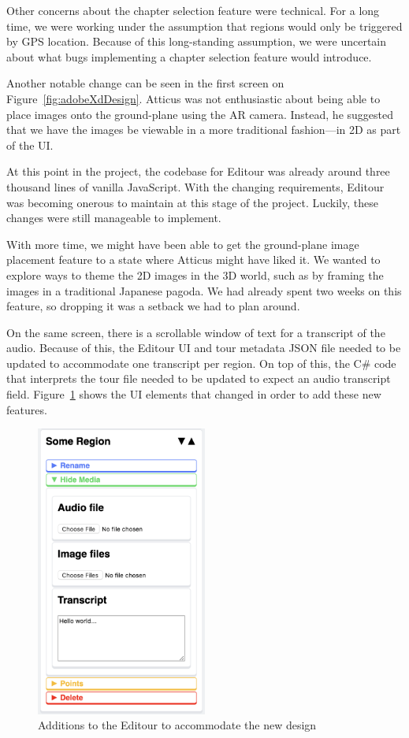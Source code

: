 \documentclass[a4paper, 10pt, american, titlepage]{article}
\begin{document}
Other concerns about the chapter selection feature were technical. For a long
time, we were working under the assumption that regions would only be triggered
by GPS location. Because of this long-standing assumption, we were uncertain
about what bugs implementing a chapter selection feature would introduce.

Another notable change can be seen in the first screen on
Figure~\ref{fig:adobeXdDesign}. Atticus was not enthusiastic about being able
to place images onto the ground-plane using the AR camera. Instead, he
suggested that we have the images be viewable in a more traditional
fashion---in 2D as part of the UI.

At this point in the project, the codebase for Editour was already around three
thousand lines of vanilla JavaScript. With the changing requirements, Editour
was becoming onerous to maintain at this stage of the project. Luckily, these
changes were still manageable to implement.

With more time, we might have been able to get the ground-plane image placement
feature to a state where Atticus might have liked it. We wanted to explore ways
to theme the 2D images in the 3D world, such as by framing the images in a
traditional Japanese pagoda. We had already spent two weeks on this feature, so
dropping it was a setback we had to plan around.

On the same screen, there is a scrollable window of text for a transcript of
the audio. Because of this, the Editour UI and tour metadata JSON file needed
to be updated to accommodate one transcript per region. On top of this, the C\#
code that interprets the tour file needed to be updated to expect an audio
transcript field.  Figure~\ref{fig:editourAdditions} shows the UI elements that
changed in order to add these new features.

\begin{figure}[h]
	\centering
	\includegraphics[width=0.5\textwidth]{editour-additions.png}
	\caption{Additions to the Editour to accommodate the new design}
	\label{fig:editourAdditions}
\end{figure}
\end{document}
